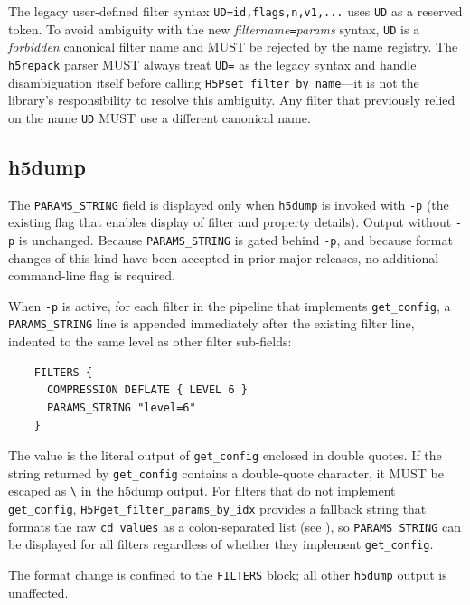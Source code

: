 \documentclass[../HDF5_RFC.tex]{subfiles}
\begin{document}
The legacy user-defined filter syntax \texttt{UD=id,flags,n,v1,...} uses
\texttt{UD} as a reserved token.  To avoid ambiguity with the new
\textit{filtername}\texttt{=}\textit{params} syntax, \texttt{UD} is a
\emph{forbidden} canonical filter name and MUST be rejected by the name
registry.  The \texttt{h5repack} parser MUST always treat \texttt{UD=} as the
legacy syntax and handle disambiguation itself before calling
\texttt{H5Pset\_filter\_by\_name}---it is not the library's responsibility to
resolve this ambiguity.  Any filter that previously relied on the name
\texttt{UD} MUST use a different canonical name.

\subsection{h5dump}

The \texttt{PARAMS\_STRING} field is displayed only when \texttt{h5dump} is invoked
with \texttt{-p} (the existing flag that enables display of filter and property
details). Output without \texttt{-p} is unchanged. Because \texttt{PARAMS\_STRING} is
gated behind \texttt{-p}, and because format changes of this kind have been
accepted in prior major releases, no additional command-line flag is required.


When \texttt{-p} is active, for each filter in the pipeline that
implements \texttt{get\_config}, a \texttt{PARAMS\_STRING} line is appended immediately
after the existing filter line, indented to the same level as other filter
sub-fields:

\begin{verbatim}
    FILTERS {
      COMPRESSION DEFLATE { LEVEL 6 }
      PARAMS_STRING "level=6"
    }
\end{verbatim}

The value is the literal output of \texttt{get\_config} enclosed in double quotes.
If the string returned by \texttt{get\_config} contains a double-quote character,
it MUST be escaped as \texttt{\textbackslash\textquotedbl} in the h5dump output. For filters that do not implement \texttt{get\_config},
\texttt{H5Pget\_filter\_params\_by\_idx} provides a fallback string that formats the
raw \texttt{cd\_values} as a colon-separated list (see ),
so \texttt{PARAMS\_STRING} can be displayed for all filters regardless of whether
they implement \texttt{get\_config}.

The format change is confined to the \texttt{FILTERS} block; all other
\texttt{h5dump} output is unaffected.
\end{document}

